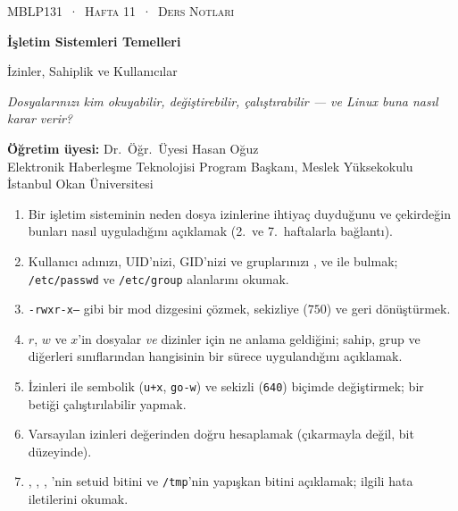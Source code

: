 \setlength{\emergencystretch}{3em}
\thispagestyle{empty}
\begin{tcolorbox}[enhanced,colback=dark,colframe=dark,arc=0pt,boxrule=0pt,
  left=18pt,right=18pt,top=20pt,bottom=20pt,coltext=white]
{\small\color{mint}\textsc{MBLP131 \,·\, Hafta 11 \,·\, Ders Notları}}\par\medskip
{\headfont\fontsize{26}{30}\selectfont\bfseries İşletim Sistemleri Temelleri}\par\medskip
{\large İzinler, Sahiplik ve Kullanıcılar}\par\smallskip
{\small\itshape\color{white!70} Dosyalarınızı kim okuyabilir, değiştirebilir, çalıştırabilir --- ve Linux buna nasıl karar verir?}
\end{tcolorbox}

\vspace{0.4em}
\begin{minipage}[t]{0.70\linewidth}
\small
\textbf{Öğretim üyesi:} Dr.\ Öğr.\ Üyesi Hasan Oğuz\\
Elektronik Haberleşme Teknolojisi Program Başkanı, Meslek Yüksekokulu\\
İstanbul Okan Üniversitesi
\end{minipage}

\vspace{0.8em}
\begin{keyidea}
\begin{enumerate}[leftmargin=1.4em]
  \item Bir işletim sisteminin neden dosya izinlerine ihtiyaç duyduğunu ve çekirdeğin bunları nasıl uyguladığını açıklamak (2.\ ve 7.\ haftalarla bağlantı).
  \item Kullanıcı adınızı, UID'nizi, GID'nizi ve gruplarınızı ,  ve  ile bulmak; \texttt{/etc/passwd} ve \texttt{/etc/group} alanlarını okumak.
  \item \texttt{-rwxr-x---} gibi bir mod dizgesini çözmek, sekizliye ($750$) ve geri dönüştürmek.
  \item $r$, $w$ ve $x$'in dosyalar \emph{ve} dizinler için ne anlama geldiğini; sahip, grup ve diğerleri sınıflarından hangisinin bir sürece uygulandığını açıklamak.
  \item İzinleri  ile sembolik (\texttt{u+x}, \texttt{go-w}) ve sekizli (\texttt{640}) biçimde değiştirmek; bir betiği çalıştırılabilir yapmak.
  \item Varsayılan izinleri  değerinden doğru hesaplamak (çıkarmayla değil, bit düzeyinde).
  \item {}, , , 'nin setuid bitini ve \texttt{/tmp}'nin yapışkan bitini açıklamak; ilgili hata iletilerini okumak.
\end{enumerate}
\end{keyidea}


